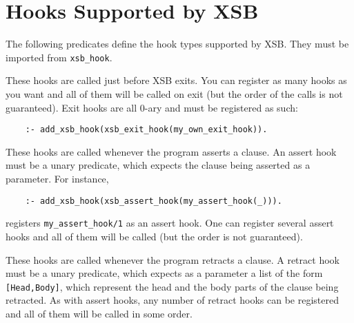 \section{Hooks Supported by XSB}

The following predicates define the hook types supported by XSB. They must
be imported from {\tt xsb\_hook}.

\begin{description}
 

These hooks are called just before XSB exits. You can register as many
hooks as you want and all of them will be called on exit (but the order of
the calls is not guaranteed). Exit hooks are all 0-ary and must be registered
as such:
\begin{verbatim}
    :- add_xsb_hook(xsb_exit_hook(my_own_exit_hook)).
\end{verbatim}


 

These hooks are called whenever the program asserts a clause. An assert
hook must be a unary predicate, which expects the clause
being asserted as a parameter. For instance,
\begin{verbatim}
    :- add_xsb_hook(xsb_assert_hook(my_assert_hook(_))).
\end{verbatim}
registers {\tt my\_assert\_hook/1} as an assert hook. One can register
several assert hooks and all of them will be called (but the order is not
guaranteed).

 

These hooks are called whenever the program retracts a clause. A retract
hook must be a unary predicate, which expects as a parameter a list of the
form {\tt [Head,Body]}, which represent the head and the body parts of the
clause being retracted. As with assert hooks, any number of retract hooks
can be registered and all of them will be called in some order.

\end{description}


